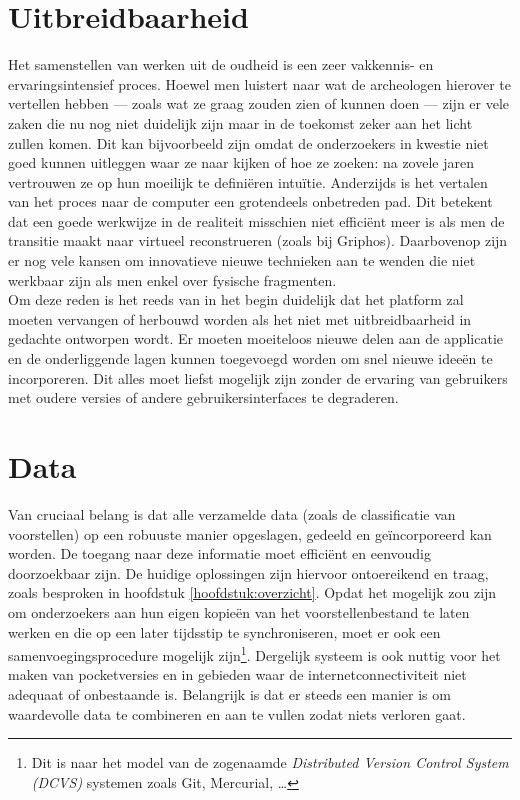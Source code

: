 \section{Uitbreidbaarheid}
Het samenstellen van werken uit de oudheid is een zeer vakkennis- en ervaringsintensief proces. Hoewel men luistert naar wat de archeologen hierover te vertellen hebben --- zoals wat ze graag zouden zien of kunnen doen --- zijn er vele zaken die nu nog niet duidelijk zijn maar in de toekomst zeker aan het licht zullen komen. Dit kan bijvoorbeeld zijn omdat de onderzoekers in kwestie niet goed kunnen uitleggen waar ze naar kijken of hoe ze zoeken: na zovele jaren vertrouwen ze op hun moeilijk te defini\"eren intu\"itie. Anderzijds is het vertalen van het proces naar de computer een grotendeels onbetreden pad. Dit betekent dat een goede werkwijze in de realiteit misschien niet effici\"ent meer is als men de transitie maakt naar virtueel reconstrueren (zoals bij Griphos). Daarbovenop zijn er nog vele kansen om innovatieve nieuwe technieken aan te wenden die niet werkbaar zijn als men enkel over fysische fragmenten.\\

Om deze reden is het reeds van in het begin duidelijk dat het platform zal moeten vervangen of herbouwd worden als het niet met uitbreidbaarheid in gedachte ontworpen wordt. Er moeten moeiteloos nieuwe delen aan de applicatie en de onderliggende lagen kunnen toegevoegd worden om snel nieuwe idee\"en te incorporeren. Dit alles moet liefst mogelijk zijn zonder de ervaring van gebruikers met oudere versies of andere gebruikersinterfaces te degraderen.

\section{Data}
Van cruciaal belang is dat alle verzamelde data (zoals de classificatie van voorstellen) op een robuuste manier opgeslagen, gedeeld en ge\"incorporeerd kan worden. De toegang naar deze informatie moet effici\"ent en eenvoudig doorzoekbaar zijn. De huidige oplossingen zijn hiervoor ontoereikend en traag, zoals besproken in hoofdstuk \ref{hoofdstuk:overzicht}. Opdat het mogelijk zou zijn om onderzoekers aan hun eigen kopie\"en van het voorstellenbestand te laten werken en die op een later tijdsstip te synchroniseren, moet er ook een samenvoegingsprocedure mogelijk zijn\footnote{Dit is naar het model van de zogenaamde \emph{Distributed Version Control System (DCVS)} systemen zoals Git, Mercurial, \ldots}. Dergelijk systeem is ook nuttig voor het maken van pocketversies en in gebieden waar de internetconnectiviteit niet adequaat of onbestaande is. Belangrijk is dat er steeds een manier is om waardevolle data te combineren en aan te vullen zodat niets verloren gaat.\\

